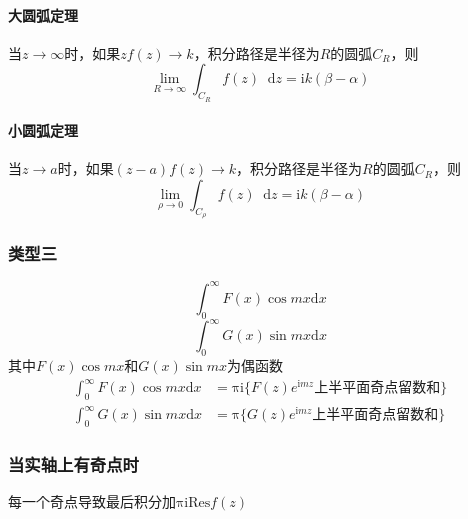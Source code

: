 \documentclass{article}
\newcommand*{\md}{\mathop{}\!\mathrm{d}}
\begin{document}
\paragraph{大圆弧定理}

当$z \rightarrow \infty$时，如果$zf(z) \rightarrow k$，积分路径是半径为$R$的圆弧$C_{R}$，则
\begin{equation*}
  \lim\limits_{R \rightarrow \infty} \int_{C_{R}} f(z) \md z = \mathrm{i} k (\beta - \alpha)
\end{equation*}

\paragraph{小圆弧定理}

当$z \rightarrow a$时，如果$(z-a)f(z) \rightarrow k$，积分路径是半径为$R$的圆弧$C_{R}$，则
\begin{equation*}
  \lim\limits_{\rho \rightarrow 0} \int_{C_{\rho}} f(z) \md z = \mathrm{i} k \left( \beta - \alpha  \right)
\end{equation*}

\subsubsection{类型三}

\begin{equation*}
  \int_{0}^{\infty} F(x) \cos mx \mathrm{d} x
\end{equation*}
\begin{equation*}
  \int_{0}^{\infty} G(x) \sin mx \mathrm{d} x
\end{equation*}
其中$F(x) \cos mx$和$ G(x) \sin mx$为偶函数
\begin{equation*}
  \begin{aligned}
    \int_{0}^{\infty} F(x) \cos mx \mathrm{d} x &= \mathrm{\pi} \mathrm{i} \{\text{$F(z)e^{\mathrm{i} m z}$上半平面奇点留数和}\}\\
    \int_{0}^{\infty} G(x) \sin mx \mathrm{d} x &= \mathrm{\pi} \{\text{$G(z)e^{\mathrm{i} m z}$上半平面奇点留数和}\}
  \end{aligned}
\end{equation*}

\subsubsection{当实轴上有奇点时}

每一个奇点导致最后积分加$\mathrm{\pi} \mathrm{i} \mathrm{Res} f(z)$
\end{document}
